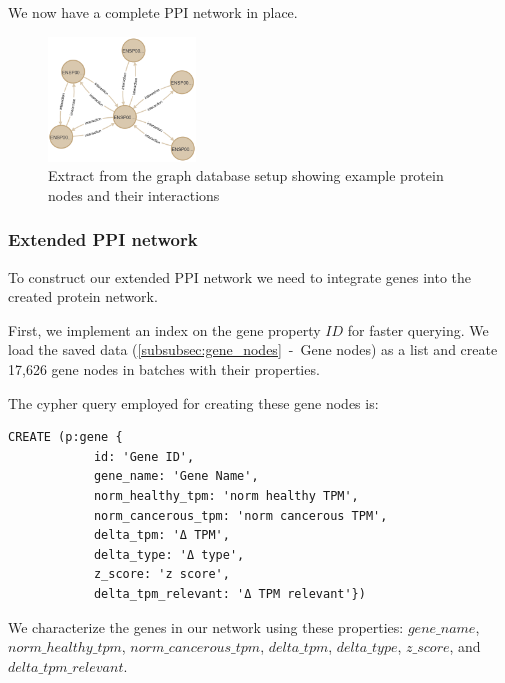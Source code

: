 We now have a complete PPI network in place.\\

\begin{figure}[h]
    \centering
    \includegraphics[width=0.35\textwidth]{figures/03_03_Basic_Network}
    \caption{Extract from the graph database setup showing example protein nodes and their interactions}
    \label{fig:03_03_Basic_Network}
\end{figure}
\vspace{\baselineskip}


\subsubsection*{Extended PPI network} \label{subsubsec:extended_ppi_network}
To construct our extended PPI network we need to integrate genes into the created protein network.

First, we implement an index on the gene property $ID$ for faster querying.
We load the saved data (\cref{subsubsec:gene_nodes}~-~Gene nodes) as a list and create 17,626 gene nodes
in batches with their properties.

The cypher query employed for creating these gene nodes is:
\begin{lstlisting}[language=Cypher, label={lst:gene_nodes}]
    CREATE (p:gene {
            id: 'Gene ID',
            gene_name: 'Gene Name',
            norm_healthy_tpm: 'norm healthy TPM',
            norm_cancerous_tpm: 'norm cancerous TPM',
            delta_tpm: 'Δ TPM',
            delta_type: 'Δ type',
            z_score: 'z score',
            delta_tpm_relevant: 'Δ TPM relevant'})
\end{lstlisting}

We characterize the genes in our network using these properties:
$gene\_name$, $norm\_healthy\_tpm$, $norm\_cancerous\_tpm$, $delta\_tpm$, $delta\_type$, $z\_score$, and $delta\_tpm\_relevant$.


